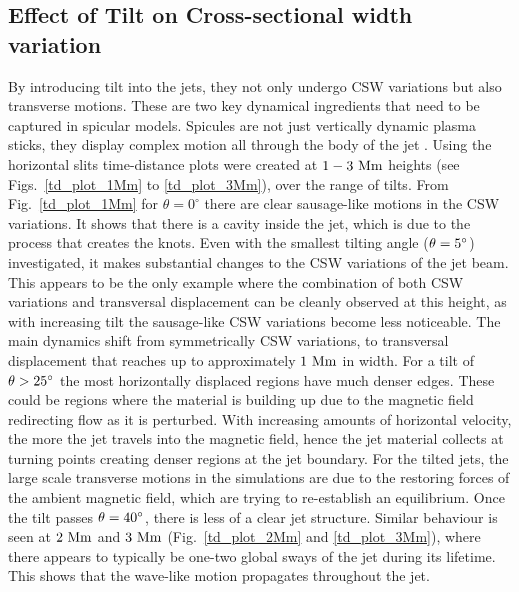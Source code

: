 %
\subsection{Effect of Tilt on Cross-sectional width variation}
\label{subsec:oscillating}
By introducing tilt into the jets, they not only undergo CSW variations but also transverse motions. These are two key dynamical ingredients that need to be captured in spicular models. Spicules are not just vertically dynamic plasma sticks, they display complex motion all through the body of the jet \citep{Sharma2018ApJ85361S}. \np
%
Using the horizontal slits time-distance plots were created at $1-3~\rm{Mm}$ heights (see Figs.~\ref{td_plot_1Mm} to \ref{td_plot_3Mm}), over the range of tilts. From Fig.~\ref{td_plot_1Mm} for $\theta=0^{\circ}$ there are clear sausage-like motions in the CSW variations. It shows that there is a cavity inside the jet, which is due to the process that creates the knots. Even with the smallest tilting angle ($\theta=5^{\circ}$) investigated, it makes substantial changes to the CSW variations of the jet beam. This appears to be the only example where the combination of both CSW variations and transversal displacement can be cleanly observed at this height, as with increasing tilt the sausage-like CSW variations become less noticeable. The main dynamics shift from symmetrically CSW variations, to transversal displacement that reaches up to approximately $1~\rm{Mm}$ in width. For a tilt of $\theta>25^{\circ}$ the most horizontally displaced regions have much denser edges. These could be regions where the material is building up due to the magnetic field redirecting flow as it is perturbed. With increasing amounts of horizontal velocity, the more the jet travels into the magnetic field, hence the jet material collects at turning points creating denser regions at the jet boundary. For the tilted jets, the large scale transverse motions in the simulations are due to the restoring forces of the ambient magnetic field, which are trying to re-establish an equilibrium. Once the tilt passes $\theta=40^{\circ}$, there is less of a clear jet structure. Similar behaviour is seen at $2~\rm{Mm}$ and $3~\rm{Mm}$ (Fig.~\ref{td_plot_2Mm} and \ref{td_plot_3Mm}), where there appears to typically be one-two global sways of the jet during its lifetime. This shows that the wave-like motion propagates throughout the jet. \np
